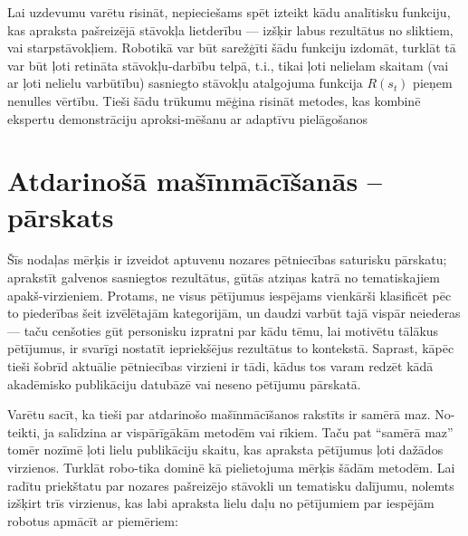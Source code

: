 \documentclass[12pt, a4paper]{article}
\numberwithin{equation}{section} %
\begin{document}
Lai uzdevumu varētu risināt, nepieciešams spēt izteikt kādu analītisku funkciju, kas apraksta pašreizējā stāvokļa lietderību --- izšķir labus rezultātus no sliktiem, vai starpstāvokļiem. Robotikā var būt sarežģīti šādu funkciju izdomāt, turklāt tā var būt ļoti retināta stāvokļu-darbību telpā, t.i., tikai ļoti nelielam skaitam (vai ar ļoti nelielu varbūtību) sasniegto stāvokļu atalgojuma funkcija $R(s_t)$ pieņem nenulles vērtību. Tieši šādu trūkumu mēģina risināt metodes, kas kombinē ekspertu demonstrāciju aproksi-mēšanu ar adaptīvu pielāgošanos \cite{nair2018overcoming}


%
%
%
%
%
%
%
%
%
%
%
%
%
%
%
%
%
%
%

\newpage
\section{Atdarinošā mašīnmācīšanās -- pārskats}

Šīs nodaļas mērķis ir izveidot aptuvenu nozares pētniecības saturisku pārskatu; aprakstīt galvenos sasniegtos rezultātus, gūtās atziņas katrā no tematiskajiem apakš-virzieniem. Protams, ne visus pētījumus iespējams vienkārši klasificēt pēc to piederības šeit izvēlētajām kategorijām, un daudzi varbūt tajā vispār neiederas --- taču cenšoties gūt personisku izpratni par kādu tēmu, lai motivētu tālākus pētījumus, ir svarīgi nostatīt iepriekšējus rezultātus to kontekstā. Saprast, kāpēc tieši šobrīd aktuālie pētniecības virzieni ir tādi, kādus tos varam redzēt kādā akadēmisko publikāciju datubāzē vai neseno pētījumu pārskatā.

Varētu sacīt, ka tieši par atdarinošo mašīnmācīšanos rakstīts ir samērā maz. No-teikti, ja salīdzina ar vispārīgākām metodēm vai rīkiem. Taču pat ``samērā maz'' tomēr nozīmē ļoti lielu publikāciju skaitu, kas apraksta pētījumus ļoti dažādos virzienos. Turklāt robo-tika dominē kā pielietojuma mērķis šādām metodēm. Lai radītu priekštatu par nozares pašreizējo stāvokli un tematisku dalījumu, nolemts izšķirt trīs virzienus, kas labi apraksta lielu daļu no pētījumiem par iespējām robotus apmācīt ar piemēriem:
\end{document}
